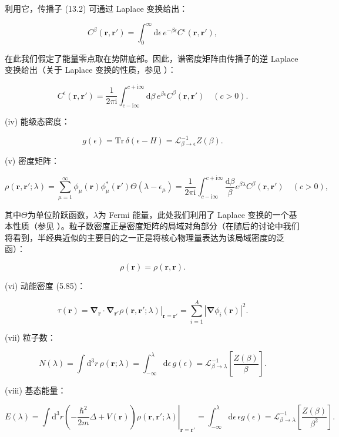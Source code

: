 利用它，传播子 (13.2) 可通过 Laplace 变换给出：

\[
C^{\beta}(\boldsymbol{r},\boldsymbol{r}')=\int^{\infty}_{0}\mathrm{d}\epsilon\,e^{-\beta\epsilon}C^{\epsilon}(\boldsymbol{r},\boldsymbol{r}'),
\]

在此我们假定了能量零点取在势阱底部。因此，谱密度矩阵由传播子的逆 Laplace 变换给出（关于 Laplace 变换的性质，参见
\cite{PB55,AS65}）：

\[
C^{\epsilon}(\boldsymbol{r},\boldsymbol{r}')=\frac{1}{2\pi\mathrm{i}}\int^{c+\mathrm{i}\infty}_{c-\mathrm{i}\infty}\mathrm{d}\beta\,e^{\beta\epsilon}C^{\beta}(\boldsymbol{r},\boldsymbol{r}')\quad(c>0).
\]

(iv) 能级态密度：

\[
g(\epsilon)=\mathrm{Tr}\,\delta(\epsilon-H)=\mathcal{L}^{-1}_{\beta\to\epsilon}Z(\beta).
\]

(v) 密度矩阵：

\[
\rho(\boldsymbol{r},\boldsymbol{r}';\lambda)=\sum^{\infty}_{\mu=1}\phi_{\mu}(\boldsymbol{r})\phi^{*}_{\mu}(\boldsymbol{r}')\Theta(\lambda-\epsilon_{\mu})=\frac{1}{2\pi\mathrm{i}}\int^{c+\mathrm{i}\infty}_{c-\mathrm{i}\infty}\frac{\mathrm{d}\beta}{\beta}e^{\beta\lambda}C^{\beta}(\boldsymbol{r},\boldsymbol{r}')\quad(c>0),
\]

其中$\Theta$为单位阶跃函数，$\lambda$为 Fermi 能量，此处我们利用了 Laplace 变换的一个基本性质（参见
\cite[第 29 章]{AS65}）。粒子数密度正是密度矩阵的局域对角部分（在随后的讨论中我们将看到，半经典近似的主要目的之一正是将核心物理量表达为该局域密度的泛函）：

\[
\rho(\boldsymbol{r})=\rho(\boldsymbol{r},\boldsymbol{r}).
\]

(vi) 动能密度 (5.85)：

\[
\tau(\boldsymbol{r})=\left.\boldsymbol{\nabla}_{\boldsymbol{r}}\cdot\boldsymbol{\nabla}_{\boldsymbol{r}'}\rho(\boldsymbol{r},\boldsymbol{r}';\lambda)\right|_{\boldsymbol{r}=\boldsymbol{r}'}=\sum^{A}_{i=1}|\boldsymbol{\nabla}\phi_{i}(\boldsymbol{r})|^{2}.
\]

(vii) 粒子数：

\[
N(\lambda)=\int\mathrm{d}^{3}r\,\rho(\boldsymbol{r};\lambda)=\int^{\lambda}_{-\infty}\mathrm{d}\epsilon\,g(\epsilon)=\mathcal{L}^{-1}_{\beta\to\lambda}\left[\frac{Z(\beta)}{\beta}\right].
\]

(viii) 基态能量：

\[
E(\lambda)=\int\mathrm{d}^{3}r\left.\left(-\frac{\hbar^{2}}{2m}\Delta+V(\boldsymbol{r})\right)\rho(\boldsymbol{r},\boldsymbol{r}';\lambda)\right|_{\boldsymbol{r}=\boldsymbol{r}'}=\int^{\lambda}_{-\infty}\mathrm{d}\epsilon\,\epsilon g(\epsilon)=\mathcal{L}^{-1}_{\beta\to\lambda}\left[\frac{Z(\beta)}{\beta^{2}}\right].
\]

